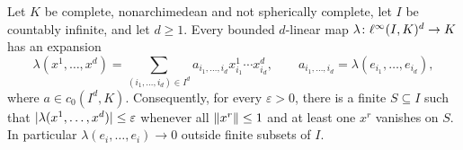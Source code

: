\begin{lemma}\label{scalar:tail}
Let $K$ be complete, nonarchimedean and not spherically complete, let $I$ be countably infinite, and let
$d\ge1$. Every bounded $d$\nobreakdash-linear map $\lambda\colon\ell^\infty(I,K)^d\to K$ has an expansion
\begin{equation}\label{scalar:array}
 \lambda(x^1,\dots,x^d)
 =\sum_{(i_1,\dots,i_d)\in I^d}a_{i_1,\dots,i_d}x^1_{i_1}\cdots x^d_{i_d},
 \qquad a_{i_1,\dots,i_d}=\lambda(e_{i_1},\dots,e_{i_d}),
\end{equation}
where $a\in c_0(I^d,K)$. Consequently, for every $\varepsilon>0$, there is a finite $S\subseteq I$ such that
$\lvert \lambda(x^1,\dots,x^d)\rvert\le\varepsilon$ whenever all $\lVert x^r\rVert\le1$ and at least one $x^r$ vanishes
on $S$. In particular $\lambda(e_i,\dots,e_i)\to0$ outside finite subsets of $I$.
\end{lemma}


